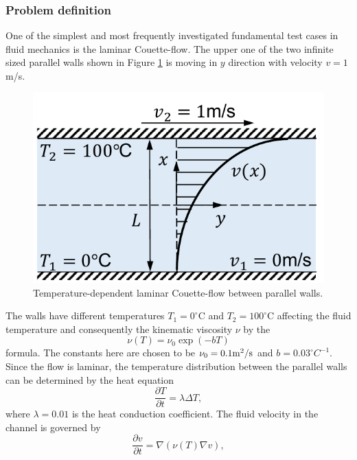 \documentclass[a4paper,12pt,openany]{book}
\theoremstyle{break}
\begin{document}
\subsubsection{Problem definition}
One of the simplest and most frequently investigated fundamental test cases in fluid mechanics is the laminar Couette-flow. The upper one of the two infinite sized parallel walls shown in Figure \ref{fig:couette} is moving in $y$ direction with velocity $v=1$m/s.
\begin{figure}[H]
  \includegraphics[scale=0.7]{couette.pdf}
  \centering
  \caption{Temperature-dependent laminar Couette-flow between parallel walls.}
  \label{fig:couette}
\end{figure}\vspace*{3pt}
The walls have different temperatures $T_1=0^\circ$C and $T_2=100^\circ$C affecting the fluid temperature and consequently the kinematic viscosity $\nu$ by the
\begin{equation}
\nu(T)=\nu_0 \exp(-bT)
\end{equation}
formula. The constants here are chosen to be $\nu_0=0.1\rm{m}^2/\rm s$ and $b=0.03 ^\circ C^{-1}$. Since the flow is laminar, the temperature distribution between the parallel walls can be determined by the heat equation
\begin{equation} \label{eq:couette_laplace}
\frac{\partial T}{\partial t}=\lambda\Delta T,
\end{equation}
where $\lambda=0.01$ is the heat conduction coefficient. The fluid velocity in the channel is governed by 
\begin{equation} \label{eq:couette_eom}
\frac{\partial v}{\partial t}=\nabla(\nu(T)\nabla v),
\end{equation}
\end{document}
